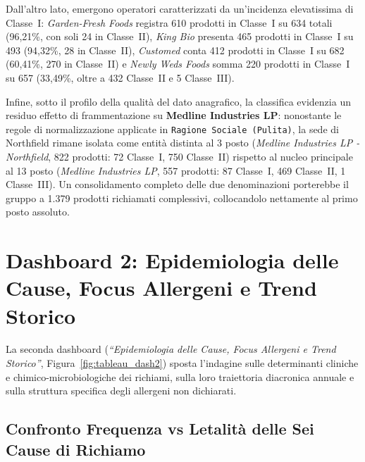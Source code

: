 Dall'altro lato, emergono operatori caratterizzati da un'incidenza elevatissima di Classe~I: \textit{Garden-Fresh Foods} registra 610 prodotti in Classe~I su 634 totali (96,21\%, con soli 24 in Classe~II), \textit{King Bio} presenta 465 prodotti in Classe~I su 493 (94,32\%, 28 in Classe~II), \textit{Customed} conta 412 prodotti in Classe~I su 682 (60,41\%, 270 in Classe~II) e \textit{Newly Weds Foods} somma 220 prodotti in Classe~I su 657 (33,49\%, oltre a 432 Classe~II e 5 Classe~III).

Infine, sotto il profilo della qualità del dato anagrafico, la classifica evidenzia un residuo effetto di frammentazione su \textbf{Medline Industries LP}: nonostante le regole di normalizzazione applicate in \texttt{Ragione Sociale (Pulita)}, la sede di Northfield rimane isolata come entità distinta al 3\textdegree{} posto (\textit{Medline Industries LP - Northfield}, 822 prodotti: 72 Classe~I, 750 Classe~II) rispetto al nucleo principale al 13\textdegree{} posto (\textit{Medline Industries LP}, 557 prodotti: 87 Classe~I, 469 Classe~II, 1 Classe~III). Un consolidamento completo delle due denominazioni porterebbe il gruppo a 1.379 prodotti richiamati complessivi, collocandolo nettamente al primo posto assoluto.


\section{Dashboard 2: Epidemiologia delle Cause, Focus Allergeni e Trend Storico}
\label{sec:tableau_dash2}

La seconda dashboard (\textit{``Epidemiologia delle Cause, Focus Allergeni e Trend Storico''}, Figura~\ref{fig:tableau_dash2}) sposta l'indagine sulle determinanti cliniche e chimico-microbiologiche dei richiami, sulla loro traiettoria diacronica annuale e sulla struttura specifica degli allergeni non dichiarati.


\subsection{Confronto Frequenza vs Letalità delle Sei Cause di Richiamo}

